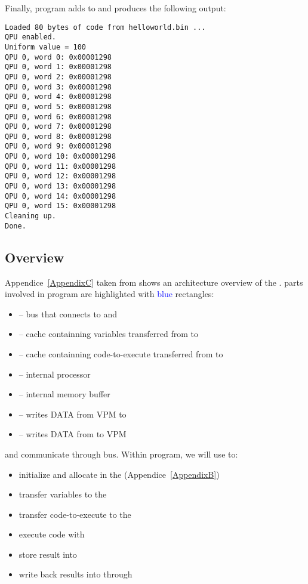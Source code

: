 Finally, program adds  to  and produces the following output:

\begin{lstlisting}
Loaded 80 bytes of code from helloworld.bin ...
QPU enabled.
Uniform value = 100
QPU 0, word 0: 0x00001298
QPU 0, word 1: 0x00001298
QPU 0, word 2: 0x00001298
QPU 0, word 3: 0x00001298
QPU 0, word 4: 0x00001298
QPU 0, word 5: 0x00001298
QPU 0, word 6: 0x00001298
QPU 0, word 7: 0x00001298
QPU 0, word 8: 0x00001298
QPU 0, word 9: 0x00001298
QPU 0, word 10: 0x00001298
QPU 0, word 11: 0x00001298
QPU 0, word 12: 0x00001298
QPU 0, word 13: 0x00001298
QPU 0, word 14: 0x00001298
QPU 0, word 15: 0x00001298
Cleaning up.
Done.
\end{lstlisting}


\subsection{\vc{} Overview}



Appendice~\ref{AppendixC} taken from \parencite{refVC} shows an architecture overview of the \vc.  parts involved in  program are highlighted with \textcolor{blue}{blue} rectangles:




\begin{itemize}
	\item {} -- bus that connects \vc{} to \ram{} and \cpu
	\item {} -- cache containning variables transferred from \cpu{} to \vc
	\item {} -- cache containning code-to-execute transferred from \cpu{} to \vc
	\item {} -- \vc{} internal processor
	\item {} -- \vc{} internal memory buffer
	\item {} -- writes DATA from VPM to \ram{}
	\item {} -- writes DATA from \ram{} to VPM
\end{itemize}
\vspace{5 mm}

\cpu{} and \vc{} communicate through  bus. Within  program, we will use \cpu{} to:
\begin{itemize}
	\item initialize and allocate \ram{} in the  (Appendice~\ref{AppendixB})
	\item transfer variables to the 
	\item transfer code-to-execute to the 
	\item execute code with 
	\item store result into 
	\item write back results into \ram{} through 
\end{itemize}


